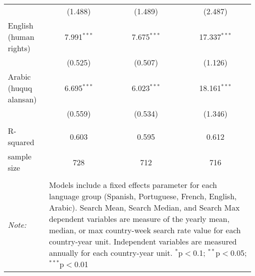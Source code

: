 \begin{table}[!htbp]
\begin{tabular}{@{\extracolsep{5pt}}lccc}
  & (1.488) & (1.489) & (2.487) \\ 
  English (human rights) & 7.991$^{***}$ & 7.675$^{***}$ & 17.337$^{***}$ \\ 
  & (0.525) & (0.507) & (1.126) \\ 
  Arabic (huquq alansan) & 6.695$^{***}$ & 6.023$^{***}$ & 18.161$^{***}$ \\ 
  & (0.559) & (0.534) & (1.346) \\ 
 \hline \\[-1.8ex] 
R-squared  & 0.603 & 0.595 & 0.612 \\ 
sample size  & 728 & 712 & 716 \\ 
\hline 
\hline \\[-1.8ex] 
\textit{Note:}  & \multicolumn{3}{l}{\parbox[t]{8cm}{Models include a fixed effects parameter for each language group (Spanish, Portuguese, French, English, Arabic). Search Mean, Search Median, and Search Max dependent variables are measure of the yearly mean, median, or max country-week search rate value for each country-year unit. Independent variables are measured annually for each country-year unit. $^{*}$p$<$0.1; $^{**}$p$<$0.05; $^{***}$p$<$0.01}} \\ 
\end{tabular} 
\end{table} 
